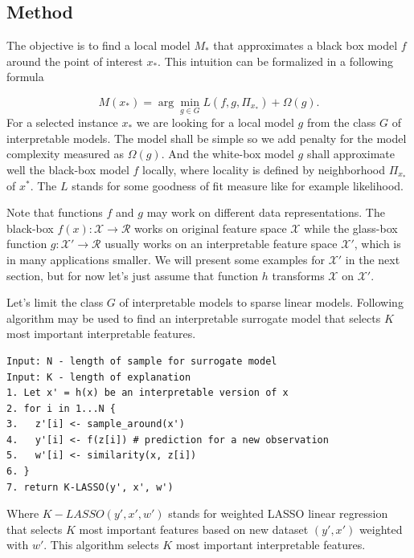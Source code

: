 \documentclass[12pt,]{krantz}
\theoremstyle{definition}
\theoremstyle{definition}
\theoremstyle{definition}
\theoremstyle{remark}
\begin{document}
\hypertarget{method-3}{%
\subsection{Method}\label{method-3}}

The objective is to find a local model \(M_{*}\) that approximates a
black box model \(f\) around the point of interest \(x_*\). This
intuition can be formalized in a following formula

\[
M(x_{*}) = \arg \min_{g \in G} L(f, g, \Pi_{x_*}) + \Omega (g). 
\] For a selected instance \(x_*\) we are looking for a local model
\(g\) from the class \(G\) of interpretable models. The model shall be
simple so we add penalty for the model complexity measured as
\(\Omega(g)\). And the white-box model \(g\) shall approximate well the
black-box model \(f\) locally, where locality is defined by neighborhood
\(\Pi_{x_*}\) of \(x^*\). The \(L\) stands for some goodness of fit
measure like for example likelihood.

Note that functions \(f\) and \(g\) may work on different data
representations. The black-box
\(f(x):\mathcal X \rightarrow \mathcal R\) works on original feature
space \(\mathcal X\) while the glass-box function
\(g:\mathcal X' \rightarrow \mathcal R\) usually works on an
interpretable feature space \(\mathcal X'\), which is in many
applications smaller. We will present some examples for \(\mathcal X'\)
in the next section, but for now let's just assume that function \(h\)
transforms \(\mathcal X\) on \(\mathcal X'\).

Let's limit the class \(G\) of interpretable models to sparse linear
models. Following algorithm may be used to find an interpretable
surrogate model that selects \(K\) most important interpretable
features.

\begin{verbatim}
Input: N - length of sample for surrogate model
Input: K - length of explanation
1. Let x' = h(x) be an interpretable version of x
2. for i in 1...N {
3.   z'[i] <- sample_around(x')
4.   y'[i] <- f(z[i]) # prediction for a new observation
5.   w'[i] <- similarity(x, z[i])
6. }
7. return K-LASSO(y', x', w')
\end{verbatim}

Where \(K-LASSO(y', x', w')\) stands for weighted LASSO linear
regression that selects \(K\) most important features based on new
dataset \((y', x')\) weighted with \(w'\). This algorithm selects \(K\)
most important interpretable features.
\end{document}
